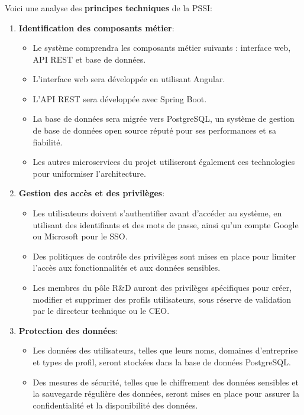 \documentclass[a4paper, 11pt]{report}
\begin{document}
  \subsubsection{}
  Voici une analyse des \textbf{principes techniques} de la PSSI:
  \begin{enumerate}
    \item \textbf{Identification des composants métier}:
      \begin{itemize}
        \item Le système comprendra les composants métier suivants : interface web, API REST et base de données.
        \item L'interface web sera développée en utilisant Angular.
        \item L'API REST sera développée avec Spring Boot.
        \item La base de données sera migrée vers PostgreSQL, un système de gestion de base de données open source réputé pour ses performances et sa fiabilité.
        \item Les autres microservices du projet utiliseront également ces technologies pour uniformiser l'architecture.
      \end{itemize}
    \item \textbf{Gestion des accès et des privilèges}:
      \begin{itemize}
        \item Les utilisateurs doivent s'authentifier avant d'accéder au système, en utilisant des identifiants et des mots de passe, ainsi qu'un compte Google ou Microsoft pour le SSO.
        \item Des politiques de contrôle des privilèges sont mises en place pour limiter l'accès aux fonctionnalités et aux données sensibles.
        \item Les membres du pôle R&D auront des privilèges spécifiques pour créer, modifier et supprimer des profils utilisateurs, sous réserve de validation par le directeur technique ou le CEO.
      \end{itemize}
    \item \textbf{Protection des données}:
      \begin{itemize}
        \item Les données des utilisateurs, telles que leurs noms, domaines d'entreprise et types de profil, seront stockées dans la base de données PostgreSQL.
        \item Des mesures de sécurité, telles que le chiffrement des données sensibles et la sauvegarde régulière des données, seront mises en place pour assurer la confidentialité et la disponibilité des données.

\end{itemize}
\end{enumerate}
\end{document}
